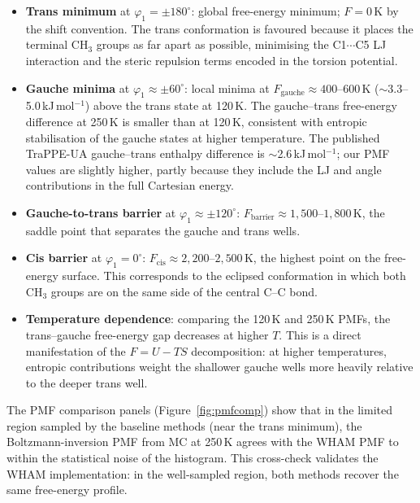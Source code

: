 \documentclass[12pt,a4paper]{article}
\begin{document}
\begin{itemize}
  \item \textbf{Trans minimum} at $\varphi_1 = \pm 180^{\circ}$: global
        free-energy minimum; $F = 0$\,K by the shift convention.
        The trans conformation is favoured because it places the terminal
        CH$_3$ groups as far apart as possible, minimising the C1$\cdots$C5
        LJ interaction and the steric repulsion terms encoded in the torsion
        potential.

  \item \textbf{Gauche minima} at $\varphi_1 \approx \pm 60^{\circ}$:
        local minima at $F_{\mathrm{gauche}} \approx 400$--$600$\,K
        ($\sim$3.3--5.0\,kJ\,mol$^{-1}$) above the trans state at 120\,K.
        The gauche--trans free-energy difference at 250\,K is smaller than
        at 120\,K, consistent with entropic stabilisation of the gauche
        states at higher temperature.  The published TraPPE-UA gauche--trans
        enthalpy difference is $\sim$2.6\,kJ\,mol$^{-1}$; our PMF values
        are slightly higher, partly because they include the LJ and angle
        contributions in the full Cartesian energy.

  \item \textbf{Gauche-to-trans barrier} at $\varphi_1 \approx \pm 120^{\circ}$:
        $F_{\mathrm{barrier}} \approx 1{,}500$--$1{,}800$\,K, the saddle
        point that separates the gauche and trans wells.

  \item \textbf{Cis barrier} at $\varphi_1 = 0^{\circ}$:
        $F_{\mathrm{cis}} \approx 2{,}200$--$2{,}500$\,K, the highest
        point on the free-energy surface.  This corresponds to the eclipsed
        conformation in which both CH$_3$ groups are on the same side of the
        central C--C bond.

  \item \textbf{Temperature dependence}: comparing the 120\,K and 250\,K
        PMFs, the trans--gauche free-energy gap decreases at higher $T$.
        This is a direct manifestation of the $F = U - TS$ decomposition:
        at higher temperatures, entropic contributions weight the shallower
        gauche wells more heavily relative to the deeper trans well.
\end{itemize}

The PMF comparison panels (Figure~\ref{fig:pmfcomp}) show that in the
limited region sampled by the baseline methods (near the trans minimum),
the Boltzmann-inversion PMF from MC at 250\,K agrees with the WHAM PMF
to within the statistical noise of the histogram.  This cross-check
validates the WHAM implementation: in the well-sampled region, both
methods recover the same free-energy profile.
\end{document}
